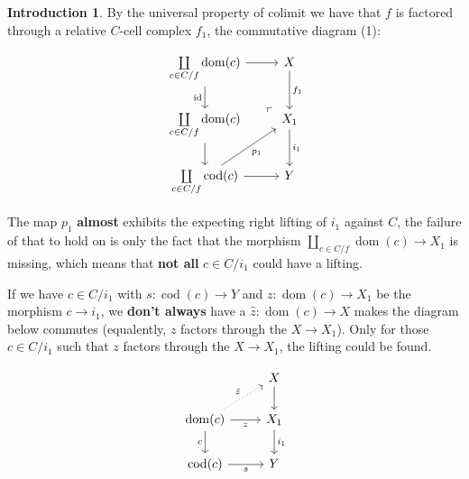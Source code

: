 \documentclass[a4paper]{article}
\theoremstyle{plain}
\theoremstyle{definition}
\newtheorem{intro}[defn]{Introduction}
\theoremstyle{remark}
\newcommand{\id}{\mathrm{id}}
\DeclareMathOperator{\dom}{dom}
\DeclareMathOperator{\cod}{cod}
\begin{document}
\begin{intro}
            \par By the universal property of colimit we have that $f$ is factored through a relative $C$-cell complex $f_1$,
            the commutative diagram (1):

            \[\begin{tikzcd}
                {{\coprod\limits_{c\in C/f} \dom(c)}} & X \\
                {{\coprod\limits_{c\in C/f} \dom(c)}} & {X_1} \\
                {{\coprod\limits_{c\in C/f} \cod(c)}} & Y
                \arrow["\id"', from=1-1, to=2-1]
                \arrow[from=2-1, to=3-1]
                \arrow[from=3-1, to=3-2]
                \arrow["i_1", from=2-2, to=3-2]
                \arrow[from=1-1, to=1-2]
                \arrow["{f_1}", from=1-2, to=2-2]
                \arrow["{p_1}"', from=3-1, to=2-2]
                \arrow["{\Big \lrcorner}"{anchor=center, pos=0.125, rotate=180}, shift left=1, draw=none, from=2-2, to=1-1]
            \end{tikzcd}\]

            \par The map $p_1$ \textbf{almost} exhibits the expecting right lifting of $i_1$ against $C$,
            the failure of that to hold on is only the fact that the morphism ${{\coprod\limits_{c\in C/f} \dom(c)}} \to {X_1} $ is missing,
            which means that \textbf{not all} $c \in C/i_1$ could have a lifting.
            \par If we have $c \in C/i_1$ with $s : \cod(c) \to Y$ and $z : \dom(c) \to X_1$ be the morphism $c \to i_1$,
            we \textbf{don't always} have a $\hat{z} : \dom(c) \to X$ makes the diagram below commutes
            (equalently, $z$ factors through the $X \to X_1$).
            Only for those $c \in C/i_1$ such that $z$ factors through the $X \to X_1$,
            the lifting could be found.

            \[\begin{tikzcd}
                & X \\
                {\dom(c)} & {X_1} \\
                {\cod(c)} & Y
                \arrow["c"', from=2-1, to=3-1]
                \arrow["s"', from=3-1, to=3-2]
                \arrow["z"', from=2-1, to=2-2]
                \arrow["{i_1}", from=2-2, to=3-2]
                \arrow["{\hat{z}}", dotted, from=2-1, to=1-2]
                \arrow[from=1-2, to=2-2]
            \end{tikzcd}\]


\end{intro}
\end{document}
